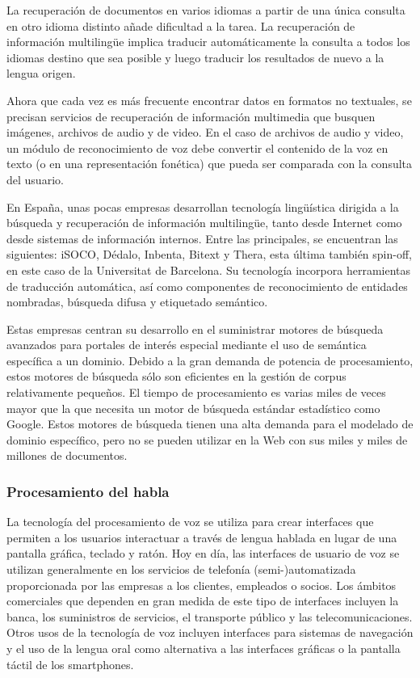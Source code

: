 \begin{multicols}{2}
La recuperación de documentos en varios idiomas a partir de una única consulta en otro idioma distinto añade dificultad a la tarea. La recuperación de información multilingüe implica traducir automáticamente la consulta a todos los idiomas destino que sea posible y luego traducir los resultados de nuevo a la lengua origen.

Ahora que cada vez es más frecuente encontrar datos en formatos no textuales, se precisan servicios de recuperación de información multimedia que busquen imágenes, archivos de audio y de video. En el caso de archivos de audio y video, un módulo de reconocimiento de voz debe convertir el contenido de la voz en texto (o en una representación fonética) que pueda ser comparada con la consulta del usuario.

En España, unas pocas empresas desarrollan tecnología lingüística dirigida a la búsqueda y recuperación de información multilingüe, tanto desde Internet como desde sistemas de información internos. Entre las principales, se encuentran las siguientes: iSOCO, Dédalo, Inbenta, Bitext y Thera, esta última también spin-off, en este caso de la Universitat de Barcelona. Su tecnología incorpora herramientas de traducción automática, así como componentes de reconocimiento de entidades nombradas, búsqueda difusa y etiquetado semántico.

Estas empresas centran su desarrollo en el suministrar motores de búsqueda avanzados para portales de interés especial mediante el uso de semántica específica a un dominio. Debido a la gran demanda de potencia de procesamiento, estos motores de búsqueda sólo son eficientes en la gestión de corpus relativamente pequeños. El tiempo de procesamiento es varias miles de veces mayor que la que necesita un motor de búsqueda estándar estadístico como Google. Estos motores de búsqueda tienen una alta demanda para el modelado de dominio específico, pero no se pueden utilizar en la Web con sus miles y miles de millones de documentos.

\subsubsection{Procesamiento del habla}

La tecnología del procesamiento de voz se utiliza para crear interfaces que permiten a los usuarios interactuar a través de lengua hablada en lugar de una pantalla gráfica, teclado y ratón. Hoy en día, las interfaces de usuario de voz  se utilizan generalmente en los servicios de telefonía (semi-)automatizada proporcionada por las empresas a los clientes, empleados o socios. Los ámbitos comerciales que dependen en gran medida de este tipo de interfaces incluyen la banca, los suministros de servicios, el transporte público y las telecomunicaciones. Otros usos de la tecnología de voz incluyen interfaces para sistemas de navegación y el uso de la lengua oral como alternativa a las interfaces gráficas o la pantalla táctil de los smartphones.


\end{multicols}
